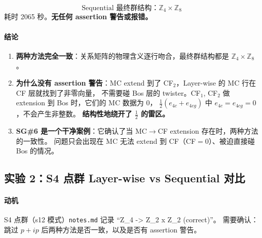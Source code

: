 \documentclass[a4paper,fontset=ubuntu,12pt]{ctexart}
\begin{document}
\begin{equation}
\boxed{\text{Sequential 最终群结构：}\mathbb{Z}_4 \times \mathbb{Z}_8}
\end{equation}
耗时 2065 秒。\textbf{无任何 assertion 警告或报错。}

\paragraph{结论}

\begin{enumerate}
\item \textbf{两种方法完全一致}：关系矩阵的物理含义逐行吻合，最终群结构都是 $\mathbb{Z}_4\times\mathbb{Z}_8$。
\item \textbf{为什么没有 assertion 警告}：MC extend 到了 CF$_2$，Layer-wise 的 MC 行在 CF 层就找到了非零向量，
  不需要碰 Bos 层的 twister。CF$_1$, CF$_2$ 做 extension 到 Bos 时，它们的 MC 数据为 0，
  $\frac{1}{2}(e_{4c}+e_{4cg})$ 中 $e_{4c}=e_{4cg}=0$，不会产生非整数。
  \textbf{结构性地绕开了 $\frac{1}{2}$ 的雷区。}
\item \textbf{SG\#6 是一个干净案例}：它确认了当 MC$\to$CF extension 存在时，两种方法的一致性。
  问题只会出现在 MC 无法 extend 到 CF（CF$=0$）、被迫直接碰 Bos 的情况。
\end{enumerate}

\subsection{实验 2：S4 点群 Layer-wise vs Sequential 对比}
\label{sec:exp2-s4}

\paragraph{动机}
S4 点群（s12 模式）\texttt{notes.md} 记录 ``Z\_4 -> Z\_2 x Z\_2 (correct)''。
需要确认：跳过 $p{+}ip$ 后两种方法是否一致，以及是否有 assertion 警告。
\end{document}
